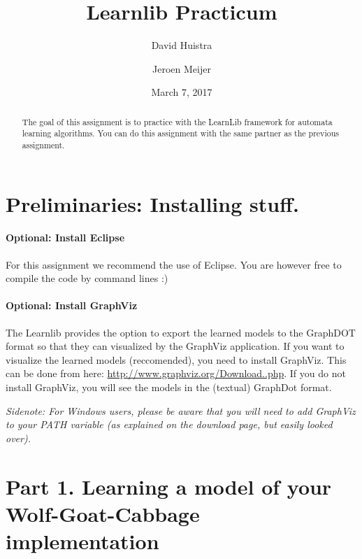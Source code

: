 \documentclass[a4paper]{article}
\title{Learnlib Practicum}
\author{David Huistra \and Jeroen Meijer}
\date{March 7, 2017}
\newcommand{\deadline}{\emph{February 16, 2016, 8:45 hours}\xspace}
\begin{document}
\maketitle

\begin{abstract}
The goal of this assignment is to practice with the LearnLib framework for automata learning algorithms.
You can do this assignment with the same partner as the previous assignment.

\end{abstract}

\section*{Preliminaries: Installing stuff.}

\paragraph{Optional: Install Eclipse}
For this assignment we recommend the use of Eclipse. You are however free to compile the code by command lines :)

\paragraph{Optional: Install GraphViz}
The Learnlib provides the option to export the learned models to the GraphDOT format so that they can visualized by the GraphViz application. If you want to visualize the learned models (reccomended), you need to install GraphViz. This can be done from here: \url{http://www.graphviz.org/Download..php}. If you do not install GraphViz, you will see the models in the (textual) GraphDot format.

\emph{Sidenote: For Windows users, please be aware that you will need to add GraphViz to your PATH variable (as explained on the download page, but easily looked over).}

\section*{Part 1. Learning a model of your Wolf-Goat-Cabbage implementation}
\end{document}
